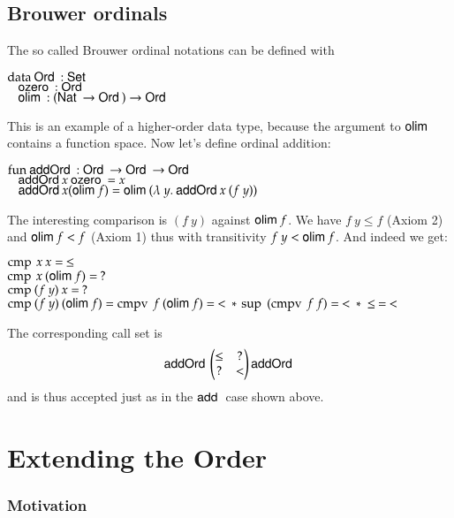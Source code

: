 \subsection{Brouwer ordinals}
The so called Brouwer ordinal notations can be defined with
\begin{bsp}
$\mathrm{data}\: \mathsf{Ord}\: : \mathsf{Set}$ \\
$\hspace*{3mm} \mathsf{ozero}\: : \mathsf{Ord}\: $\\
$\hspace*{3mm} \mathsf{olim}\: : (\mathsf{Nat}\: \rightarrow \mathsf{Ord}\: ) \rightarrow \mathsf{Ord}\: $
\end{bsp}
This is an example of a higher-order data type, because the argument to $\mathsf{olim}\:$ contains a function space.
Now let's define ordinal addition:
\begin{bsp}
$\mathrm{fun}\: \mathsf{addOrd}\: : \mathsf{Ord}\: \rightarrow \mathsf{Ord}\: \rightarrow \mathsf{Ord}\:$\\
$\hspace*{3mm} \mathsf{addOrd}\: x \: \mathsf{ozero}\: = x $\\
$\hspace*{3mm} \mathsf{addOrd}\: x (\mathsf{olim}\: f) = \mathsf{olim}\: ( \lambda\: y .\: \mathsf{addOrd}\:  x \: (f \: y))  $
\end{bsp}
The interesting comparison is $(f \: y)$ against $\mathsf{olim}\: f$.
We have  $f \: y \leq f$ (Axiom 2) and $\mathsf{olim}\: f < f $ (Axiom 1) thus with transitivity $ f\: y < \mathsf{olim}\: f$.
And indeed we get:
\begin{bsp}
$\operatorname{cmp} \: x \: x = \: \leq $\\
$\operatorname{cmp} \: x \: (\mathsf{olim}\: f) = \: ? $\\
$\operatorname{cmp} \: (f \: y) \: x = \: ? $\\
$\operatorname{cmp} \: (f \: y) \: (\mathsf{olim}\: f) = \operatorname{cmpv} \: f \: (\mathsf{olim}\: f) = \: < \: * \: \operatorname{sup}\: \: (\operatorname{cmpv} \: f \: f) = \: < \: * \: \leq \: = \: < $ 
\end{bsp}
The corresponding call set is
\[
\mathsf{addOrd}\:\begin{pmatrix}
\leq & ? \\
?    & < \\
\end{pmatrix}\mathsf{addOrd}\:
\]
and is thus accepted just as in the $\mathsf{add}\:$ case shown above.
\section{Extending the Order}

\subsubsection{Motivation}

